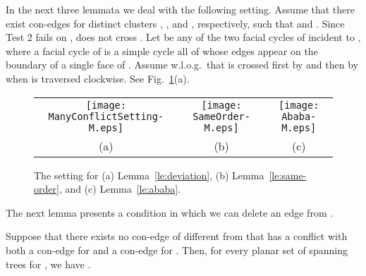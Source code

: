 \documentclass[letter,runningheads]{llncs}
\begin{document}
In the next three lemmata we deal with the following setting. Assume that there exist con-edges  for distinct clusters , , and , respectively, such that  and . Since {\sc Test 2} fails on ,  does not cross . Let  be any of the two facial cycles of  incident to , where a facial cycle of   is a simple cycle all of whose edges appear on the boundary of a single face of .  Assume w.l.o.g.\ that  is crossed first by  and then by  when  is traversed clockwise.  See Fig.~\ref{fig:many-conflicts}(a).

\begin{figure}[tb]
\begin{center}
\begin{tabular}{c c c}
\mbox{\texttt{[image: ManyConflictSetting-M.eps]}} \hspace{1mm} &
\mbox{\texttt{[image: SameOrder-M.eps]}} \hspace{1mm} &
\mbox{\texttt{[image: Ababa-M.eps]}}\\
(a) \hspace{1mm} & (b) \hspace{1mm} & (c)
\end{tabular}
\caption{The setting for (a) Lemma~\ref{le:deviation}, (b) Lemma~\ref{le:same-order}, and (c) Lemma~\ref{le:ababa}.}
\label{fig:many-conflicts}
\end{center}
\end{figure}



The next lemma presents a condition in which we can delete an edge  from .

\begin{lemma}[{\sc Simplification 4}]\label{le:deviation}
Suppose that there exists no con-edge of  different from  that has a conflict with both a con-edge for  and a con-edge for . Then, for every planar set  of spanning trees for , we have .
\end{lemma}
\end{document}
